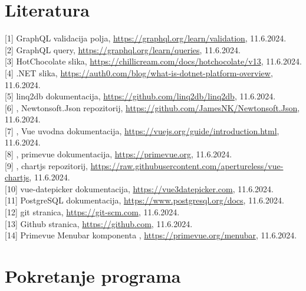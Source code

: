 \documentclass[zavrsnirad]{fer}
\begin{document}
\backmatter

\chapter{Literatura}
\label{literature:1} [1] GraphQL validacija polja, \url{https://graphql.org/learn/validation}, 11.6.2024.
\\\label{literature:2} [2] GraphQL query, \url{https://graphql.org/learn/queries}, 11.6.2024.
\\\label{literature:3} [3] HotChocolate slika, \url{https://chillicream.com/docs/hotchocolate/v13}, 11.6.2024.
\\\label{literature:4} [4] .NET slika, \url{https://auth0.com/blog/what-is-dotnet-platform-overview}, 11.6.2024.
\\\label{literature:5} [5] linq2db dokumentacija, \url{https://github.com/linq2db/linq2db}, 11.6.2024.
\\\label{literature:6} [6] , Newtonsoft.Json repozitorij, \url{https://github.com/JamesNK/Newtonsoft.Json}, 11.6.2024.
\\\label{literature:7} [7] , Vue uvodna dokumentacija, \url{https://vuejs.org/guide/introduction.html}, 11.6.2024.
\\\label{literature:8} [8] , primevue dokumentacija, \url{https://primevue.org}, 11.6.2024.
\\\label{literature:9} [9] , chartjs repozitorij, \url{https://raw.githubusercontent.com/apertureless/vue-chartjs}, 11.6.2024.
\\\label{literature:10} [10] vue-datepicker dokumentacija, \url{https://vue3datepicker.com}, 11.6.2024.
\\\label{literature:11} [11] PostgreSQL dokumentacija, \url{https://www.postgresql.org/docs}, 11.6.2024.
\\\label{literature:12} [12] git stranica, \url{https://git-scm.com}, 11.6.2024.
\\\label{literature:13} [13] Github stranica, \url{https://github.com}, 11.6.2024.
\\\label{literature:14} [14] Primevue Menubar komponenta , \url{https://primevue.org/menubar}, 11.6.2024.

\chapter{Pokretanje programa}
\end{document}

